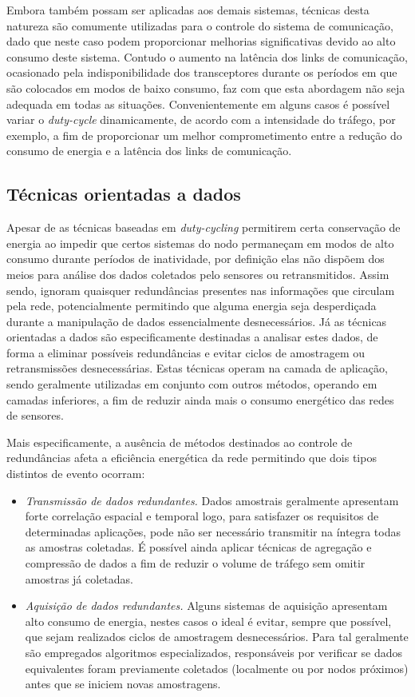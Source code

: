 \documentclass[
	12pt,				%
	openright,			%
	oneside,
	a4paper,			%
	english,			%
	french,				%
	spanish,			%
	brazil				%
	]{abntex2}
\begin{document}
Embora também possam ser aplicadas aos demais sistemas, técnicas desta natureza são comumente utilizadas para o controle do sistema de comunicação, dado que neste caso podem proporcionar melhorias significativas devido ao alto consumo deste sistema. Contudo o aumento na latência dos links de comunicação, ocasionado pela indisponibilidade dos transceptores durante os períodos em que são colocados em modos de baixo consumo, faz com que esta abordagem não seja adequada em todas as situações. Convenientemente em alguns casos é possível variar o \textit{duty-cycle} dinamicamente, de acordo com a intensidade do tráfego, por exemplo, a fim de proporcionar um melhor comprometimento entre a redução do consumo de energia e a latência dos links de comunicação.

\subsection{Técnicas orientadas a dados}

Apesar de as técnicas baseadas em \textit{duty-cycling} permitirem certa conservação de energia ao impedir que certos sistemas do nodo permaneçam em modos de alto consumo durante períodos de inatividade, por definição elas não dispõem dos meios para análise dos dados coletados pelo sensores ou retransmitidos. Assim sendo, ignoram quaisquer redundâncias presentes nas informações que circulam pela rede, potencialmente permitindo que alguma energia seja desperdiçada durante a manipulação de dados essencialmente desnecessários. Já as técnicas orientadas a dados são especificamente destinadas a analisar estes dados, de forma a eliminar possíveis redundâncias e evitar ciclos de amostragem ou retransmissões desnecessárias. Estas técnicas operam na camada de aplicação, sendo geralmente utilizadas em conjunto com outros métodos, operando em camadas inferiores, a fim de reduzir ainda mais o consumo energético das redes de sensores.

Mais especificamente, a ausência de métodos destinados ao controle de redundâncias afeta a eficiência energética da rede permitindo que dois tipos distintos de evento ocorram:

\begin{itemize}
	\item \textit{Transmissão de dados redundantes.} Dados amostrais geralmente apresentam forte correlação espacial e temporal logo, para satisfazer os requisitos de determinadas aplicações, pode não ser necessário transmitir na íntegra todas as amostras coletadas. É possível ainda aplicar técnicas de agregação e compressão de dados a fim de reduzir o volume de tráfego sem omitir amostras já coletadas.
	\item \textit{Aquisição de dados redundantes.} Alguns sistemas de aquisição apresentam alto consumo de energia, nestes casos o ideal é evitar, sempre que possível, que sejam realizados ciclos de amostragem desnecessários. Para tal geralmente são empregados algoritmos especializados, responsáveis por verificar se dados equivalentes foram previamente coletados (localmente ou por nodos próximos) antes que se iniciem novas amostragens.
\end{itemize}
\end{document}
